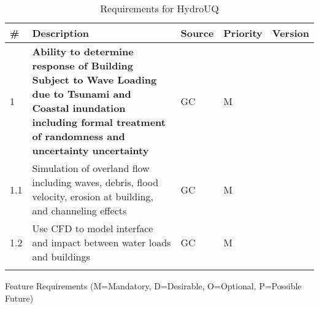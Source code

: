 \begin{longtable}{| p{} | p{} | p{} | p{} |  p{} |}
                               \toprule
       \# & Description & Source & Priority & Version \\ \hline
1 & \textbf{Ability to determine response of Building Subject to Wave Loading due to Tsunami and Coastal inundation including formal treatment of randomness and uncertainty uncertainty} & GC & M &  \\ \hline
1.1 & Simulation of overland flow including waves, debris, flood velocity, erosion at building, and channeling effects & GC & M & \\ \hline
1.2 & Use CFD to model interface and impact between water loads and buildings & GC & M & \\ \hline
\bottomrule 
\caption{Requirements for HydroUQ} 
\label{tab:featureRequirements}                 
\end{longtable}

Feature Requirements (M=Mandatory, D=Desirable, O=Optional, P=Possible Future)

